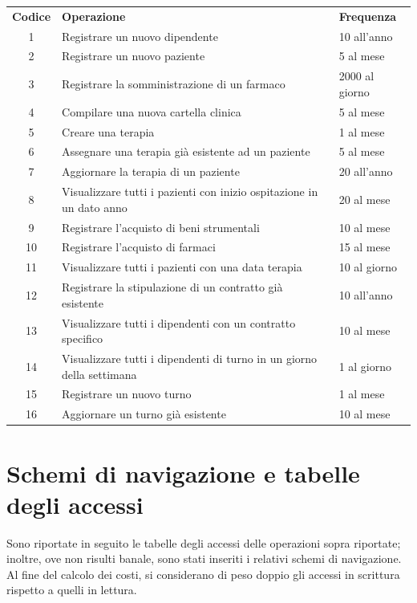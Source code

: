 \documentclass[a4paper, 12pt]{report}
\begin{document}
\renewcommand{\arraystretch}{1.2}
\begin{tabularx}{\textwidth}{cXl}
        \rowcolor{seaGreen}
        \textbf{Codice} & \textbf{Operazione} & \textbf{Frequenza} \\
        1 & Registrare un nuovo dipendente & 10 all'anno \\
        \hline
        2 & Registrare un nuovo paziente & 5 al mese \\
        \hline
        3 & Registrare la somministrazione di un farmaco & 2000 al giorno \\
        \hline
        4 & Compilare una nuova cartella clinica & 5 al mese \\
        \hline
        5 & Creare una terapia & 1 al mese \\
        \hline
        6 & Assegnare una terapia già esistente ad un paziente & 5 al mese \\
        \hline
        7 & Aggiornare la terapia di un paziente & 20 all'anno \\
        \hline
        8 & Visualizzare tutti i pazienti con inizio ospitazione in un dato anno & 20 al mese \\
        \hline
        9 & Registrare l'acquisto di beni strumentali & 10 al mese \\
        \hline
        10 & Registrare l'acquisto di farmaci & 15 al mese \\
        \hline
        11 & Visualizzare tutti i pazienti con una data terapia & 10 al giorno \\
        \hline
        12 & Registrare la stipulazione di un contratto già esistente & 10 all'anno \\
        \hline
        13 & Visualizzare tutti i dipendenti con un contratto specifico & 10 al mese\\
        \hline
        14 & Visualizzare tutti i dipendenti di turno in un giorno della settimana & 1 al giorno \\
        \hline
        15 & Registrare un nuovo turno & 1 al mese \\
        \hline
        16 & Aggiornare un turno già esistente & 10 al mese \\
        \hline
\end{tabularx}

\section{Schemi di navigazione e tabelle degli accessi}
Sono riportate in seguito le tabelle degli accessi delle operazioni sopra riportate; inoltre, ove
non risulti banale, sono stati inseriti i relativi schemi di navigazione. Al fine del calcolo dei
costi, si considerano di peso doppio gli accessi in scrittura rispetto a quelli in lettura.
\end{document}
